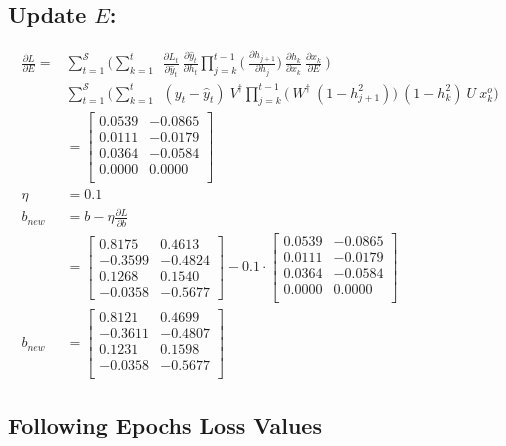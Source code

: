\documentclass{article}
\begin{document}
\subsection{Update $E$:}
\begin{align*}
     \frac{\partial L}{ \partial{E}} = &\sum_{t=1}^{\mathcal{S}} 
	\bigg(	
	 \sum_{k=1}^{t} ~
	~\frac{\partial L_t}{\partial \hat{y}_t}
	~\frac{\partial \hat{y}_t}{\partial h_t}
        \prod_{j=k}^{t-1} \bigg(
	~\frac{\partial h_{j+1}}{\partial h_{j}}
        \bigg)
	~\frac{\partial h_k}{\partial x_k}~\frac{\partial x_k}{\partial E}~
	\bigg) \\
 &\sum_{t=1}^{\mathcal{S}} 
	\bigg(	
	 \sum_{k=1}^{t} ~
	~(y_t - \hat{y}_t)
	~V^\dagger
        \prod_{j=k}^{t-1} \bigg(
	~W^\dagger ~ (1 - h_{j+1}^2)
        \bigg)
	~(1-h_k^2)~ U~ x^o_k
	\bigg)  \\
 &=\begin{bmatrix}
0.0539 & -0.0865\\
0.0111 & -0.0179\\
0.0364 & -0.0584\\
0.0000 & 0.0000\\
\end{bmatrix} \\
\eta &= 0.1\\
b_{new} &= b - \eta \frac{\partial L}{\partial b}\\
 &= \begin{bmatrix}
  0.8175 & 0.4613 \\
 -0.3599 & -0.4824 \\
  0.1268 & 0.1540 \\
 -0.0358 & -0.5677
\end{bmatrix}- 0.1 \cdot \begin{bmatrix}
0.0539 & -0.0865\\
0.0111 & -0.0179\\
0.0364 & -0.0584\\
0.0000 & 0.0000\\
\end{bmatrix} \\
b_{new} &= \begin{bmatrix}
0.8121 & 0.4699\\
-0.3611 & -0.4807\\
0.1231 & 0.1598\\
-0.0358 & -0.5677\\
\end{bmatrix}
\end{align*}
\subsection{Following Epochs Loss Values}
\end{document}
